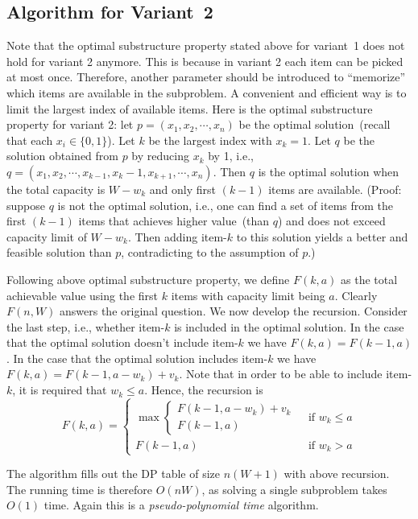 \subsection*{Algorithm for Variant~2}

Note that the optimal substructure property stated above for variant~1 does not hold for variant 2 anymore.
This is because in variant 2 each item can be picked at most once. Therefore, another parameter should
be introduced to ``memorize'' which items are available in the subproblem. A convenient and efficient way is to
limit the largest index of available items. Here is the optimal substructure property for variant 2:
let $p = (x_1, x_2, \cdots, x_n)$ be the optimal solution~(recall that each $x_i \in \{0,1\}$).
Let $k$ be the largest index with $x_k = 1$.
Let $q$ be the solution obtained from $p$ by
reducing $x_k$ by 1, i.e., $q = (x_1, x_2, \cdots, x_{k-1}, x_k - 1, x_{k + 1}, \cdots, x_n)$.
Then $q$ is the optimal solution when the total capacity is $W - w_k$ and only first $(k-1)$ items are available.
(Proof: suppose $q$ is not the optimal solution,
i.e., one can find a set of items from the first $(k-1)$ items that achieves higher value~(than $q$) and does not exceed capacity limit of $W - w_k$.
Then adding item-$k$ to this solution yields a better and feasible solution than $p$, contradicting to the assumption of $p$.)

Following above optimal substructure property,
we define $F(k, a)$ as the total achievable value using the first $k$ items with capacity limit being $a$.
Clearly $F(n, W)$ answers the original question.
We now develop the recursion.
Consider the last step, i.e., whether item-$k$ is included in the optimal solution.
In the case that the optimal solution doesn't include item-$k$ we have $F(k,a) = F(k-1,a)$.
In the case that the optimal solution includes item-$k$ we have $F(k,a) = F(k-1,a-w_k) + v_k$.
Note that in order to be able to include item-$k$, it is required that $w_k \le a$.
Hence, the recursion is
\begin{displaymath}
F(k,a) = 
\left\{
	\begin{array}{lllll}
	 \max \left\{
			\begin{array}{lllll}
			F(k-1,a-w_k) + v_k\\
			F(k-1,a)
			\end{array}
		\right. & \textrm{ if } w_k \le a \\
	F(k-1,a) & \textrm{ if } w_k > a
	\end{array}
\right.
\end{displaymath}

The algorithm fills out the DP table of size $n(W + 1)$
with above recursion. The running time is therefore $O(nW)$, as solving
a single subproblem takes $O(1)$ time.
Again this is a \emph{pseudo-polynomial time} algorithm. 

